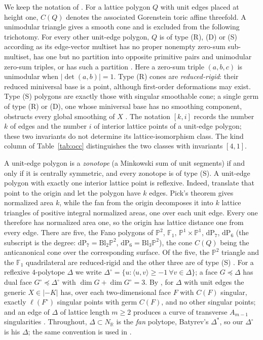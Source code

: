 \documentclass[11pt]{amsart}
\theoremstyle{definition}
\theoremstyle{remark}
\newcommand{\RR}{\mathbb{R}}
\newcommand{\PP}{\mathbb{P}}
\newcommand{\FF}{\mathbb{F}}
\newcommand{\NN}{N}
\begin{document}
We keep the notation of \cite{paper1}.  For a lattice polygon $Q$ with unit
edges placed at height one, $C(Q)$ denotes the associated Gorenstein toric
affine threefold.  A unimodular triangle gives a smooth cone and is
excluded from the following trichotomy.  For every other unit-edge
polygon, $Q$ is of type \textup{(R)}, \textup{(D)} or \textup{(S)}
according as its edge-vector multiset has no proper nonempty zero-sum
sub-multiset, has one but no partition into opposite primitive pairs and
unimodular zero-sum triples, or has such a partition
\cite{Altmann97,CFP}.  Here a zero-sum triple $(a,b,c)$ is unimodular
when $|\det(a,b)|=1$.  Type \textup{(R)} cones are \emph{reduced-rigid}: their reduced miniversal
base is a point, although first-order deformations may exist.  Type \textup{(S)} polygons are
exactly those with singular smoothable cone; a single germ of type \textup{(R)} or
\textup{(D)}, one whose miniversal base has no smoothing component,
obstructs every global smoothing of $X$
\cite[Lemma~4.1, Cor.~4.3]{paper1}.  The notation $[k,i]$ records the number $k$ of edges and the number $i$
of interior lattice points of a unit-edge polygon; these two invariants
do not determine its lattice-isomorphism class.  The kind column of
Table~\ref{tab:occ} distinguishes the two classes with invariants $[4,1]$.

A
unit-edge polygon is a
\emph{zonotope} (a Minkowski sum of unit segments) if and only if it is
centrally symmetric, and every zonotope is of type \textup{(S)}.  A unit-edge
polygon with exactly one interior lattice point is reflexive.  Indeed,
translate that point to the origin and let the polygon have $k$ edges.
Pick's theorem gives normalized area $k$, while the fan from the origin
decomposes it into $k$ lattice triangles of positive integral normalized
areas, one over each unit edge.  Every one therefore has normalized area
one, so the origin has lattice distance one from every edge.  There are
five, the Fano polygons of $\PP^2$, $\FF_1$, $\PP^1{\times}\PP^1$,
$\mathrm{dP}_7$, $\mathrm{dP}_6$ (the subscript is the degree:
$\mathrm{dP}_7 = \mathrm{Bl}_2\PP^2$, $\mathrm{dP}_6 = \mathrm{Bl}_3\PP^2$),
the cone $C(Q)$ being the anticanonical
cone over the corresponding surface.  Of the five, the $\PP^2$ triangle and
the $\FF_1$ quadrilateral are reduced-rigid and the other three are of type
\textup{(S)} \cite[Rem.~2.6]{paper1}.  For a reflexive $4$-polytope $\Delta$ we write
$\Delta^\circ = \{u : \langle u,v\rangle \ge -1\ \forall v \in \Delta\}$; a
face $G \preceq \Delta$ has dual face $G^\circ \preceq \Delta^\circ$ with
$\dim G + \dim G^\circ = 3$.  By
\cite[Prop.~3.1]{paper1}, for $\Delta$ with unit edges the generic
$X \in |{-K}|$ has, over each two-dimensional face $F$ with $C(F)$
singular, exactly
$\ell(F^\circ)$ singular points with germ $C(F)$, and no other singular
points; and an edge of $\Delta$ of lattice length $m \ge 2$ produces a curve
of transverse $A_{m-1}$ singularities \cite[Rem.~3.2]{paper1}.  Throughout,
$\Delta \subset \NN_\RR$ is the \emph{fan} polytope, Batyrev's
$\Delta^\ast$, so our $\Delta^\circ$ is his $\Delta$; the same
convention is used in \cite{paper1,paper2}.
\end{document}
